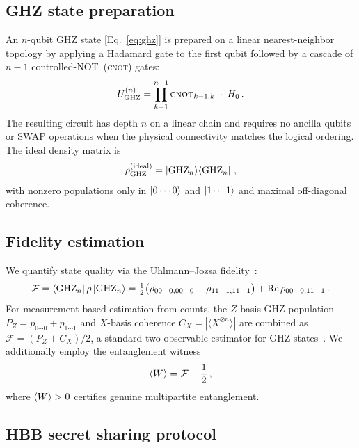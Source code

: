 \documentclass[aip, amsmath, amssymb, preprint, longbibliography]{revtex4-2}
\newcommand{\ghz}{\text{GHZ}}
\newcommand{\cnot}{\textsc{cnot}}
\newcommand{\fid}{\mathcal{F}}
\begin{document}
\subsection{GHZ state preparation}\label{sec:ghz_prep}

An $n$-qubit GHZ state [Eq.~\eqref{eq:ghz}] is prepared on a linear
nearest-neighbor topology by applying a Hadamard gate to the first qubit
followed by a cascade of $n-1$ controlled-NOT~(\cnot{}) gates:
\begin{equation}
U_{\ghz}^{(n)} = \prod_{k=1}^{n-1}\cnot_{k-1,k}\;\cdot\;H_0\,.
\label{eq:ghz_circuit}
\end{equation}
The resulting circuit has depth $n$ on a linear chain and requires no
ancilla qubits or SWAP operations when the physical connectivity matches
the logical ordering. The ideal density matrix is
\begin{equation}
\rho_{\ghz}^{(\text{ideal})} = \ket{\ghz_n}\!\bra{\ghz_n}\,,
\end{equation}
with nonzero populations only in $\ket{0\cdots0}$ and $\ket{1\cdots1}$
and maximal off-diagonal coherence.

\subsection{Fidelity estimation}\label{sec:fid_est}

We quantify state quality via the Uhlmann--Jozsa
fidelity~\cite{NielsenChuang2010}:
\begin{equation}
\fid = \bra{\ghz_n}\rho\ket{\ghz_n}
     = \tfrac{1}{2}\bigl(\rho_{00\cdots0,00\cdots0}
       + \rho_{11\cdots1,11\cdots1}\bigr)
       + \text{Re}\,\rho_{00\cdots0,11\cdots1}\,.
\label{eq:fidelity}
\end{equation}
For measurement-based estimation from counts, the $Z$-basis GHZ
population $P_Z = p_{0\cdots0}+p_{1\cdots1}$ and $X$-basis coherence
$C_X = |\langle X^{\otimes n}\rangle|$ are combined as
$\fid = (P_Z + C_X)/2$, a standard two-observable estimator for GHZ
states~\cite{Guhne2009,Toth2005}. We additionally employ the entanglement
witness~\cite{Guhne2009,Toth2005}
\begin{equation}
\braket{W} = \fid - \frac{1}{2}\,,
\label{eq:witness}
\end{equation}
where $\braket{W}>0$ certifies genuine multipartite entanglement.

\subsection{HBB secret sharing protocol}\label{sec:hbb}
\end{document}
